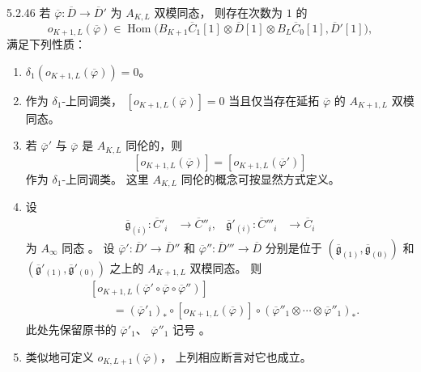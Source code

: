 \begin{lemma}{5.2.46}\label{lem:5-2-46}
若
$\overline\varphi:
\overline D\to\overline D'$
为 $A_{K,L}$ 双模同态，
则存在次数为 $1$ 的
\[
o_{K+1,L}(\overline\varphi)
\in\operatorname{Hom}\bigl(
B_{K+1}\overline C_1[1]
\otimes\overline D[1]
\otimes B_L\overline C_0[1],
\overline D'[1]\bigr),
\]
满足下列性质：
\begin{enumerate}[label=\textup{(5.2.47.\arabic*)},leftmargin=5.8em]
\item\label{cond:5-2-47-1}
$\delta_1(o_{K+1,L}(\overline\varphi))=0$。
\item\label{cond:5-2-47-2}
作为 $\delta_1$-上同调类，
$[o_{K+1,L}(\overline\varphi)]=0$
当且仅当存在延拓
$\overline\varphi$ 的
$A_{K+1,L}$ 双模同态。
\item\label{cond:5-2-47-3}
若 $\overline\varphi'$ 与
$\overline\varphi$
是 $A_{K,L}$ 同伦的，则
\[
[o_{K+1,L}(\overline\varphi)]
=[o_{K+1,L}(\overline\varphi')]
\]
作为 $\delta_1$-上同调类。
这里 $A_{K,L}$ 同伦的概念可按显然方式定义。
\item\label{cond:5-2-47-4}
设
\[
\begin{aligned}
\overline{\mathfrak g}_{(i)}:
\overline C'_i&\longrightarrow\overline C''_i,
&
\overline{\mathfrak g}'_{(i)}:
\overline C'''_i&\longrightarrow\overline C_i
\end{aligned}
\]
为 $A_\infty$ 同态
。
设
$\overline\varphi':
\overline D'\to\overline D''$
和
$\overline\varphi'':
\overline D'''\to\overline D$
分别是位于
$(\overline{\mathfrak g}_{(1)},
  \overline{\mathfrak g}_{(0)})$
和
$(\overline{\mathfrak g}'_{(1)},
  \overline{\mathfrak g}'_{(0)})$
之上的 $A_{K+1,L}$ 双模同态。
则
\[
\begin{aligned}
&[o_{K+1,L}
(\overline\varphi'\circ
 \overline\varphi\circ
 \overline\varphi'')]\\
&\qquad=
(\overline\varphi'_1)_*
\circ[o_{K+1,L}(\overline\varphi)]
\circ
(\overline\varphi''_1\otimes\cdots
\otimes\overline\varphi''_1)_*.
\end{aligned}
\]
此处先保留原书的
$\overline\varphi'_1$、
$\overline\varphi''_1$ 记号
。
\item\label{cond:5-2-47-5}
类似地可定义
$o_{K,L+1}(\overline\varphi)$，
上列相应断言对它也成立。
\end{enumerate}
\end{lemma}

